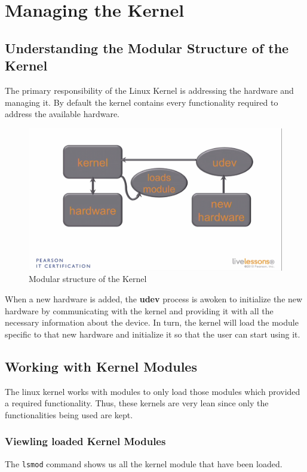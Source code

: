 \chapter{Managing the Kernel}

\section{Understanding the Modular Structure of the Kernel}	
The primary responsibility of the Linux Kernel is addressing the hardware and managing it. By default the kernel contains every functionality required to address the available hardware. 

\begin{figure}[H]
	\centering
	\includegraphics[width=0.9\linewidth]{RHCSA/Mod3/chapters/3.17.a}
	\caption{Modular structure of the Kernel}
	\label{fig:3}
\end{figure}

When a new hardware is added, the \textbf{udev} process is awoken to initialize the new hardware by communicating with the kernel and providing it with all the necessary information about the device. In turn, the kernel will load the module specific to that new hardware and initialize it so that the user can start using it. 

	\section{Working with Kernel Modules}
The linux kernel works with modules to only load those modules which provided a required functionality. Thus, these kernels are very lean since only the functionalities being used are kept. 

\subsection{Viewling loaded Kernel Modules}
\vspace{-5pt}
The \verb|lsmod| command shows us all the kernel module that have been loaded. 

